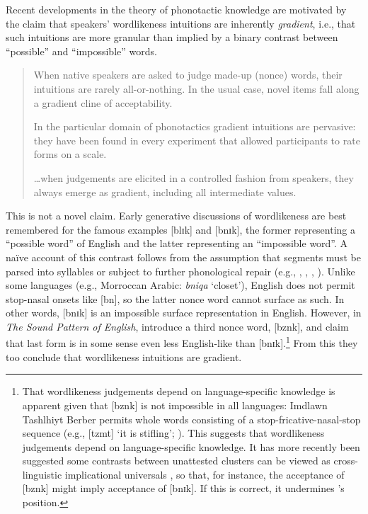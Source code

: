 \label{gradience}

Recent developments in the theory of phonotactic knowledge are motivated by the claim that speakers' wordlikeness intuitions are inherently \emph{gradient}, i.e., that such intuitions are more granular than implied by a binary contrast between ``possible'' and ``impossible'' words.

\begin{quote}
When native speakers are asked to judge made-up (nonce) words, their intuitions are rarely all-or-nothing. 
In the usual case, novel items fall along a gradient cline of acceptability. \citep[][9]{Albright2009a}

In the particular domain of phonotactics gradient intuitions are pervasive: they have been found in every experiment that allowed participants to rate forms on a scale.
\citep[][382]{Hayes2008a}

\ldots{}when judgements are elicited in a controlled fashion from speakers, they always emerge as gradient, including all intermediate values. \citep[371]{Shademan2006} 
\end{quote}

This is not a novel claim. Early generative discussions of wordlikeness \citep[e.g.,][]{Chomsky1965,Halle1962} are best remembered for the famous examples [blɪk] and [bnɪk], the former representing a ``possible word'' of English and the latter representing an ``impossible word''. 
A naïve account of this contrast follows from the assumption that segments must be parsed into syllables or subject to further phonological repair (e.g., \citealt[10f.]{Hooper1973}, \citealt[57f.]{Kahn1976}, \citealt{Ito1989a}, \citealt[19f.]{Wolf2009}). 
Unlike some languages (e.g., Morroccan Arabic: \emph{bniqa} `closet'), English does not permit stop-nasal onsets like [bn], so the latter nonce word cannot surface as such. 
In other words, [bnɪk] is an impossible surface representation in English. 
However, in \emph{The Sound Pattern of English}, \citet{SPE} introduce a third nonce word, [bznk], and claim that last form is in some sense even less English-like than [bnɪk].\footnote{
    That wordlikeness judgements depend on language-specific knowledge is apparent given that [bznk] is not impossible in all languages: Imdlawn Tashlhiyt Berber permits whole words consisting of a stop-fricative-nasal-stop sequence (e.g., [tzmt] `it is stifling'; \citealt[112]{Dell1985}). 
    This suggests that wordlikeness judgements depend on language-specific knowledge.
    It has more recently been suggested some contrasts between unattested clusters can be viewed as cross-linguistic implicational universals \citep[e.g.,][]{Berent2007a,Berent2008a,Berent2009,Berent2007b}, so that, for instance, the acceptance of [bznk] might imply acceptance of [bnɪk]. 
    If this is correct, it undermines \citeauthor{SPE}'s position.}
From this they too conclude that wordlikeness intuitions are gradient.

